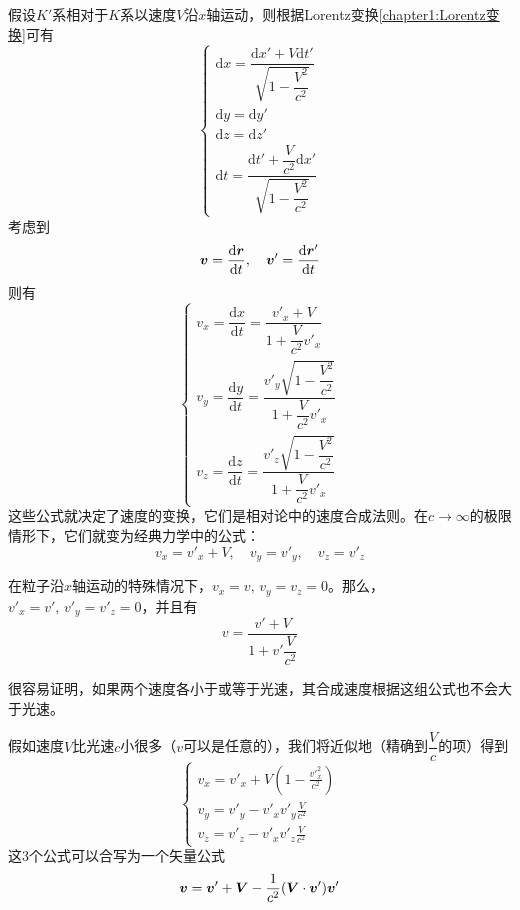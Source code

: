 假设$K'$系相对于$K$系以速度$V$沿$x$轴运动，则根据Lorentz变换\eqref{chapter1:Lorentz变换}可有
\begin{equation*}
\begin{cases}
	\mathrm{d} x = \dfrac{\mathrm{d}x'+V\mathrm{d}t'}{\sqrt{1-\dfrac{V^2}{c^2}}} \\
	\mathrm{d} y = \mathrm{d} y' \\
	\mathrm{d} z = \mathrm{d} z' \\
	\mathrm{d} t = \dfrac{\mathrm{d}t'+\dfrac{V}{c^2} \mathrm{d}x'}{\sqrt{1-\dfrac{V^2}{c^2}}}
\end{cases}
\end{equation*}
考虑到
\begin{equation*}
	\boldsymbol{v} = \frac{\mathrm{d} \boldsymbol{r}}{\mathrm{d} t},\quad \boldsymbol{v}' = \frac{\mathrm{d} \boldsymbol{r}'}{\mathrm{d} t}
\end{equation*}
则有
\begin{equation}
\begin{cases}
	v_x = \dfrac{\mathrm{d}x}{\mathrm{d}t} = \dfrac{v'_x+V}{1+\dfrac{V}{c^2}v'_x} \\[1.5ex]
	v_y = \dfrac{\mathrm{d}y}{\mathrm{d}t} = \dfrac{v'_y\sqrt{1-\dfrac{V^2}{c^2}}}{1+\dfrac{V}{c^2}v'_x} \\[1.5ex]
	v_z = \dfrac{\mathrm{d}z}{\mathrm{d}t} = \dfrac{v'_z\sqrt{1-\dfrac{V^2}{c^2}}}{1+\dfrac{V}{c^2}v'_x}
\end{cases}
\label{chapter1:速度的变换关系}
\end{equation}
这些公式就决定了速度的变换，它们是相对论中的速度合成法则。在$c\to\infty$的极限情形下，它们就变为经典力学中的公式：
\begin{equation*}
	v_x = v'_x+V,\quad v_y = v'_y,\quad v_z = v'_z
\end{equation*}

在粒子沿$x$轴运动的特殊情况下，$v_x=v,\,v_y=v_z=0$。那么，$v'_x=v',\,v'_y=v'_z=0$，并且有
\begin{equation}
	v = \frac{v'+V}{1+v'\dfrac{V}{c^2}}
\end{equation}

很容易证明，如果两个速度各小于或等于光速，其合成速度根据这组公式也不会大于光速。

假如速度$V$比光速$c$小很多（$v$可以是任意的），我们将近似地（精确到$\dfrac{V}{c}$的项）得到
\begin{equation}
\begin{cases}
	\displaystyle v_x = v'_x+V\left(1-\frac{v'^2_x}{c^2}\right) \\[1.5ex]
	\displaystyle v_y = v'_y-v'_xv'_y\frac{V}{c^2} \\[1.5ex]
	\displaystyle v_z = v'_z-v'_xv'_z\frac{V}{c^2}
\end{cases}
\end{equation}
这3个公式可以合写为一个矢量公式
\begin{equation}
	\boldsymbol{v} = \boldsymbol{v}' + \boldsymbol{V} - \frac{1}{c^2}(\boldsymbol{V}\cdot \boldsymbol{v}') \boldsymbol{v}'
\end{equation}

